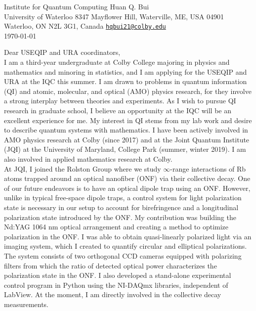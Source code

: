 \documentclass[10pt]{article}
\begin{document}
	
\noindent Institute for Quantum Computing \hfill Huan Q. Bui\\
\noindent University of Waterloo \hfill 8347 Mayflower Hill, Waterville, ME, USA 04901 \\
\noindent Waterloo, ON N2L 3G1, Canada  \hfill \href{mailto:hqbui21@colby.edu}{\texttt{hqbui21@colby.edu}}\\

\hfill \today


\noindent Dear USEQIP and URA coordinators, \\



\noindent I am a third-year undergraduate at Colby College majoring in physics and mathematics and minoring in statistics, and I am applying for the USEQIP and URA at the IQC this summer. I am drawn to problems in quantum information (QI) and atomic, molecular, and optical (AMO) physics research, for they involve a strong interplay between theories and experiments. As I wish to pursue QI research in graduate school, I believe an opportunity at the IQC will be an excellent experience for me. My interest in QI stems from my lab work and desire to describe quantum systems with mathematics. I have been actively involved in AMO physics research at Colby (since 2017) and at the Joint Quantum Institute (JQI) at the University of Maryland, College Park (summer, winter 2019). I am also involved in applied mathematics research at Colby.  \\


At JQI, I joined the Rolston Group where we study $\infty$-range interactions of Rb atoms trapped around an optical nanofiber (ONF) via their collective decay. One of our future endeavors is to have an optical dipole trap using an ONF. However, unlike in typical free-space dipole traps, a control system for light polarization state is necessary in our setup to account for birefringence and a longitudinal polarization state introduced by the ONF. My contribution was building the Nd:YAG 1064 nm optical arrangement and creating a method to optimize polarization in the ONF. I was able to obtain quasi-linearly polarized light via an imaging system, which I created to quantify circular and elliptical polarizations. The system consists of two orthogonal CCD cameras equipped with polarizing filters from which the ratio of detected optical power characterizes the polarization state in the ONF. I also developed a stand-alone experimental control program in Python using the NI-DAQmx libraries, independent of LabView. At the moment, I am directly involved in the collective decay measurements.\\ 
\end{document}
